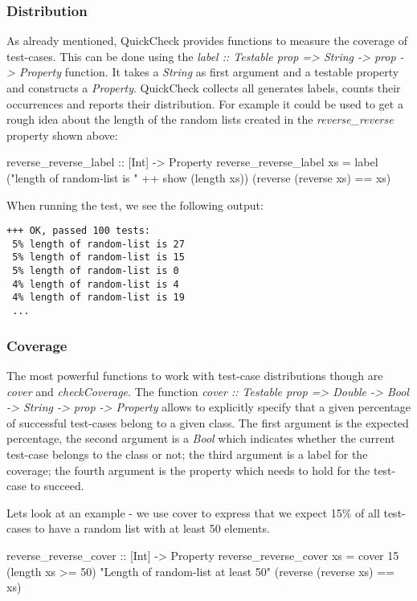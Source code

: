 \subsubsection*{Distribution}
As already mentioned, QuickCheck provides functions to measure the coverage of test-cases. This can be done using the 
\textit{label :: Testable prop => String -> prop -> Property} function. It takes a \textit{String} as first argument and a testable property and constructs a \textit{Property}. QuickCheck collects all generates labels, counts their occurrences and reports their distribution. For example it could be used to get a rough idea about the length of the random lists created in the \textit{reverse\_reverse} property shown above:

\begin{HaskellCode}
reverse_reverse_label :: [Int] -> Property
reverse_reverse_label xs  
  = label ("length of random-list is " ++ show (length xs)) 
          (reverse (reverse xs) == xs)
\end{HaskellCode}
When running the test, we see the following output:

\begin{verbatim}
+++ OK, passed 100 tests:
 5% length of random-list is 27
 5% length of random-list is 15
 5% length of random-list is 0
 4% length of random-list is 4
 4% length of random-list is 19
 ...
\end{verbatim}

\subsubsection*{Coverage}
The most powerful functions to work with test-case distributions though are \textit{cover} and \textit{checkCoverage}. The function \textit{cover :: Testable prop => Double -> Bool -> String -> prop -> Property} allows to explicitly specify that a given percentage of successful test-cases belong to a given class. The first argument is the expected percentage, the second argument is a \textit{Bool} which indicates whether the current test-case belongs to the class or not; the third argument is a label for the coverage; the fourth argument is the property which needs to hold for the test-case to succeed. 

Lets look at an example - we use cover to express that we expect 15\% of all test-cases to have a random list with at least 50 elements.

\begin{HaskellCode}
reverse_reverse_cover :: [Int] -> Property
reverse_reverse_cover xs  
  = cover 15 (length xs >= 50) "Length of random-list at least 50"
             (reverse (reverse xs) == xs)
\end{HaskellCode}

